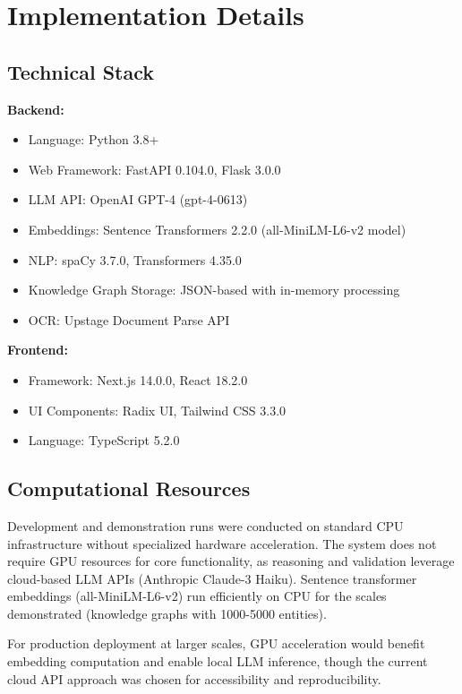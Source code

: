\documentclass{article}
\begin{document}



\appendix

\section{Implementation Details}
\label{appendix:implementation}

\subsection{Technical Stack}

\textbf{Backend:}
\begin{itemize}
\item Language: Python 3.8+
\item Web Framework: FastAPI 0.104.0, Flask 3.0.0
\item LLM API: OpenAI GPT-4 (gpt-4-0613)
\item Embeddings: Sentence Transformers 2.2.0 (all-MiniLM-L6-v2 model)
\item NLP: spaCy 3.7.0, Transformers 4.35.0
\item Knowledge Graph Storage: JSON-based with in-memory processing
\item OCR: Upstage Document Parse API
\end{itemize}

\textbf{Frontend:}
\begin{itemize}
\item Framework: Next.js 14.0.0, React 18.2.0
\item UI Components: Radix UI, Tailwind CSS 3.3.0
\item Language: TypeScript 5.2.0
\end{itemize}

\subsection{Computational Resources}

Development and demonstration runs were conducted on standard CPU infrastructure without specialized hardware acceleration. The system does not require GPU resources for core functionality, as reasoning and validation leverage cloud-based LLM APIs (Anthropic Claude-3 Haiku). Sentence transformer embeddings (all-MiniLM-L6-v2) run efficiently on CPU for the scales demonstrated (knowledge graphs with 1000-5000 entities).

For production deployment at larger scales, GPU acceleration would benefit embedding computation and enable local LLM inference, though the current cloud API approach was chosen for accessibility and reproducibility.
\end{document}
